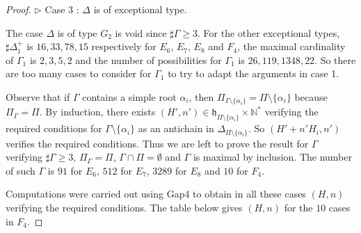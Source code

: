 \documentclass{amsart}
\theoremstyle{definition}
\theoremstyle{remark}
\numberwithin{equation}{section}
\begin{document}
\begin{proof}
\noindent$\triangleright$ Case 3 : $\Delta$ is of exceptional type.
\smallskip

The case $\Delta$ is of type $G_{2}$ is void since $\sharp \Gamma \geqslant 3$.
For the other exceptional types, $\sharp \Delta_{1}^{+}$ is 
$16, 33, 78, 15$ respectively for $E_{6}$, $E_{7}$, $E_{8}$ and $F_{4}$, the maximal 
cardinality of $\Gamma_{1}$ is $2, 3, 5, 2$ and the number of possibilities for $\Gamma_{1}$ is
$26, 119, 1348, 22$. So there are too many cases to consider for $\Gamma_{1}$
to try to adapt the arguments in case 1. 

Observe that if $\Gamma$ contains a simple root $\alpha_{i}$,
then $\Pi_{\Gamma \setminus \{ \alpha_{i}\} } = \Pi \setminus \{\alpha_{i}\}$ because
$\Pi_{\Gamma} = \Pi$. By induction, 
there exists $(H',n') \in \mathfrak{h}_{\Pi \setminus \{ \alpha_{i}\} } \times \mathbb{N}^{*}$
verifying the required conditions for $\Gamma \setminus \{ \alpha_{i}\}$ as an antichain in 
$\Delta_{\Pi \setminus \{ \alpha_{i}\} }$. So $(H' + n' H_{i} , n' )$ verifies the required
conditions. Thus we are left to prove the result for $\Gamma$ 
verifying $\sharp \Gamma \geqslant 3$, $\Pi_{\Gamma} =\Pi$, 
$\Gamma\cap \Pi = \emptyset$ and $\Gamma$ is maximal 
by inclusion. The number of such $\Gamma$  is 
$91$ for $E_{6}$, $512$ for $E_{7}$, $3289$ for $E_{8}$ and $10$ for $F_{4}$.

Computations were carried out using {\sc Gap4} to obtain in all these cases $(H,n)$ verifying the required 
conditions. The table below gives $(H,n)$ for the $10$ cases in $F_{4}$. 


\end{proof}
\end{document}
